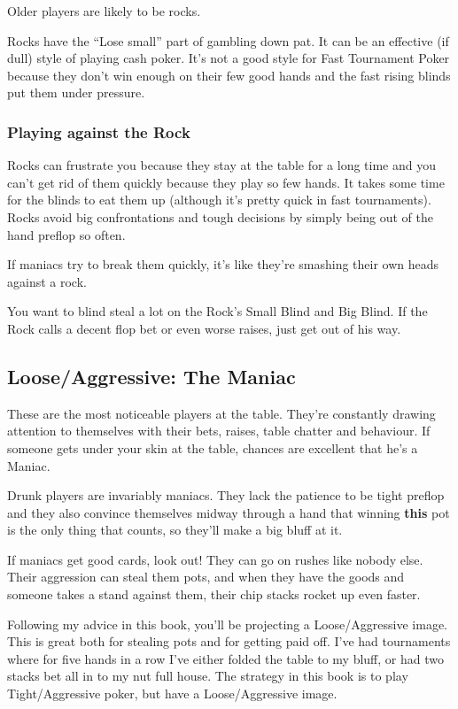 Older players are likely to be rocks.

Rocks have the ``Lose small'' part of gambling down pat. It can
be an effective (if dull) style of playing cash poker. It's not a
good style for Fast Tournament Poker because they don't win enough
on their few good hands and the fast rising blinds put them
under pressure.

\subsubsection{Playing against the Rock}

Rocks can frustrate you because they stay at the table for a long time
and you can't get rid of them quickly because they play so few hands.
It takes some time for the blinds to eat them up (although it's
pretty quick in fast tournaments). Rocks avoid big confrontations
and tough decisions by simply being out of the hand preflop so often.

If maniacs try to break them quickly,
it's like they're smashing their own heads against a rock.

You want to blind steal a lot on the Rock's Small Blind and Big Blind.
If the Rock calls a decent flop bet or even worse raises, just get
out of his way.

\subsection{Loose/Aggressive: The Maniac}

These are the most noticeable players at the table. They're constantly
drawing attention to themselves with their bets, raises, table chatter
and behaviour. If someone gets under your skin at the table, chances
are excellent that he's a Maniac.

Drunk players are invariably maniacs. They lack the patience to be
tight preflop and they also convince themselves midway through a
hand that winning \textbf{this} pot is the only thing that counts, so
they'll make a big bluff at it.

If maniacs get good cards, look out! They can go on rushes like
nobody else. Their aggression can steal them pots, and when
they have the goods and someone takes a stand against them, their
chip stacks rocket up even faster.

Following my advice in this book, you'll be projecting a Loose/Aggressive
image. This is great both for stealing pots and for getting paid off.
I've had tournaments where for five hands in a row I've either folded
the table to my bluff, or had two stacks bet all in to my nut full house.
The strategy in this book is to play Tight/Aggressive poker, but
have a Loose/Aggressive image.

